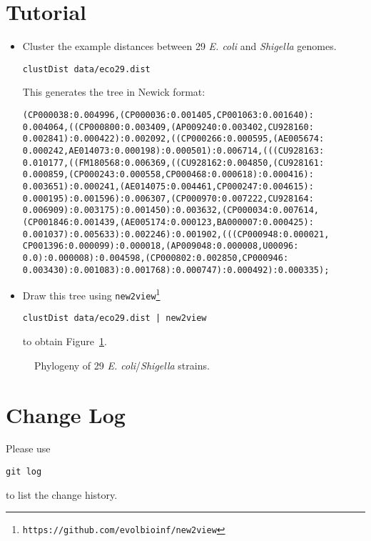 \documentclass[a4paper, english]{article}
\begin{document}
\section{Tutorial}
\begin{itemize}
  \item Cluster the example distances between 29 \emph{E. coli} and
    \emph{Shigella} genomes.
\begin{verbatim}
clustDist data/eco29.dist
\end{verbatim}
This generates the tree in Newick format:
\begin{verbatim}
(CP000038:0.004996,(CP000036:0.001405,CP001063:0.001640):
0.004064,((CP000800:0.003409,(AP009240:0.003402,CU928160:
0.002841):0.000422):0.002092,((CP000266:0.000595,(AE005674:
0.000242,AE014073:0.000198):0.000501):0.006714,(((CU928163:
0.010177,((FM180568:0.006369,((CU928162:0.004850,(CU928161:
0.000859,(CP000243:0.000558,CP000468:0.000618):0.000416):
0.003651):0.000241,(AE014075:0.004461,CP000247:0.004615):
0.000195):0.001596):0.006307,(CP000970:0.007222,CU928164:
0.006909):0.003175):0.001450):0.003632,(CP000034:0.007614,
(CP001846:0.001439,(AE005174:0.000123,BA000007:0.000425):
0.001037):0.005633):0.002246):0.001902,(((CP000948:0.000021,
CP001396:0.000099):0.000018,(AP009048:0.000008,U00096:
0.0):0.000008):0.004598,(CP000802:0.002850,CP000946:
0.003430):0.001083):0.001768):0.000747):0.000492):0.000335);
\end{verbatim}
\item Draw this tree using
  \texttt{new2view}\footnote{\texttt{https://github.com/evolbioinf/new2view}}
\begin{verbatim}
clustDist data/eco29.dist | new2view
\end{verbatim}
to obtain Figure~\ref{fig:tre}.
\end{itemize}

\begin{figure}
  \begin{center}
    
  \end{center}
  \caption{Phylogeny of 29 \textit{E. coli}/\textit{Shigella} strains.}\label{fig:tre}
\end{figure}

\section{Change Log}
Please use
\begin{verbatim}
git log
\end{verbatim}
to list the change history.


\end{document}
